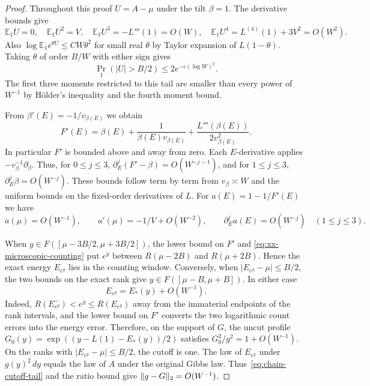 \begin{proof}
Throughout this proof $U=A-\mu$ under the tilt $\beta=1$. The derivative
bounds give
\begin{equation}\label{eq:chain-cumulant-moments}
 \mathbb E_1 U=0,\quad \mathbb E_1 U^2=V,\quad
 \mathbb E_1 U^3=-L'''(1)=O(W),\quad
 \mathbb E_1 U^4=L^{(4)}(1)+3V^2=O(W^2).
\end{equation}
Also $\log\mathbb E_1 e^{\theta U}\le CW\theta^2$ for small real
$\theta$ by Taylor expansion of $L(1-\theta)$. Taking $\theta$ of
order $B/W$ with either sign gives
\begin{equation}\label{eq:chain-cutoff-tail}
 \Pr_1(|U|>B/2)\le 2e^{-c(\log W)^2}.
\end{equation}
The first three moments restricted to this tail are smaller than every
power of $W^{-1}$ by H\"older's inequality and the fourth moment bound.

From $\beta'(E)=-1/v_{\beta(E)}$ we obtain
\begin{equation}\label{eq:xx-F-derivatives}
 F'(E)=\beta(E)+\frac1{\beta(E)v_{\beta(E)}}
                  +\frac{L'''(\beta(E))}{2v_{\beta(E)}^2}.
\end{equation}
In particular $F'$ is bounded above and away from zero. Each
$E$-derivative applies $-v_\beta^{-1}\partial_\beta$. Thus, for
$0\le j\le3$, $\partial_E^j(F'-\beta)=O(W^{-j-1})$, and for
$1\le j\le3$, $\partial_E^j\beta=O(W^{-j})$. These bounds follow
term by term from $v_\beta\asymp W$ and the uniform bounds on the
fixed-order derivatives of $L$. For $a(E)=1-1/F'(E)$ we have
\[
 a(\mu)=O(W^{-1}),\qquad
 a'(\mu)=-1/V+O(W^{-2}),\qquad
 \partial_E^j a(E)=O(W^{-j})\quad(1\le j\le3).
\]

When $y\in F([\mu-3B/2,\mu+3B/2])$, the lower bound on $F'$ and
\eqref{eq:xx-microscopic-counting} put $e^y$ between
$R(\mu-2B)$ and $R(\mu+2B)$. Hence the exact energy $E_{e^y}$ lies
in the counting window. Conversely, when $|E_{e^y}-\mu|\le B/2$,
the two bounds on the exact rank give
$y\in F([\mu-B,\mu+B])$. In either case
\begin{equation}\label{eq:xx-inverse-rank}
 E_{e^y}=E_*(y)+O(W^{-1}).
\end{equation}
Indeed, $R(E_{e^y}^-)<e^y\le R(E_{e^y})$ away from the immaterial
endpoints of the rank intervals, and the lower bound on $F'$ converts
the two logarithmic count errors into the energy error. Therefore, on
the support of $G$, the uncut profile
$G_0(y)=\exp((y-L(1)-E_*(y))/2)$ satisfies
$G_0^2/g^2=1+O(W^{-1})$. On the ranks with $|E_{e^y}-\mu|\le B/2$,
the cutoff is one. The law of $E_{e^y}$ under $g(y)^2\,dy$ equals the
law of $A$ under the original Gibbs law. Thus~\eqref{eq:chain-cutoff-tail}
and the ratio bound give $\lVert g-G\rVert_2=O(W^{-1})$.


\end{proof}
